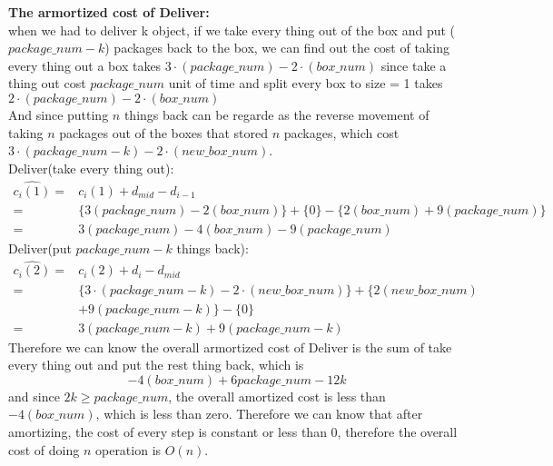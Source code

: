 \documentclass{homework}
\begin{document}
\begin{itemize}
    \textbf{The armortized cost of Deliver:}\\
    when we had to deliver k object, if we take every thing out of the box and put ($package\_num-k$) packages back to the box, we can find out the cost of taking every thing out a box takes $3\cdot(package\_num) - 2\cdot(box\_num)$ since take a thing out cost $package\_num$ unit of time and split every box to size = 1 takes $2\cdot(package\_num) - 2\cdot(box\_num)$\\
    And since putting $n$ things back can be regarde as the reverse movement of taking $n$ packages out of the boxes that stored $n$ packages, which cost $3\cdot(package\_num - k) - 2\cdot(new\_box\_num)$.\\
    Deliver(take every thing out):\\
    \begin{align*}
        \hat{c_i(1)} =& c_i(1) + d_{mid} - d_{i-1}\\
                  =& \{3(package\_num)-2(box\_num)\} + \{0\} - \{2(box\_num)+9(package\_num)\}\\
                  =& 3(package\_num)-4(box\_num)-9(package\_num)
    \end{align*}
    Deliver(put $package\_num - k$ things back):\\
    \begin{align*}
        \hat{c_i(2)} =& c_i(2) + d_i - d_{mid}\\
                  =& \{3\cdot(package\_num - k) - 2\cdot(new\_box\_num)\} + \{2(new\_box\_num)\\
                   & +9(package\_num - k)\} - \{0\}\\
                  =& 3(package\_num - k)+9(package\_num - k)
    \end{align*}
    Therefore we can know the overall armortized cost of Deliver is the sum of take every thing out and put the rest thing back, which is\\
    \[-4(box\_num) + 6package\_num - 12k\]
    and since $2k \geq package\_num$, the overall amortized cost is less than $-4(box\_num)$, which is less than zero. Therefore we can know that after amortizing, the cost of every step is constant or less than 0, therefore the overall cost of doing $n$ operation is $O(n)$.\\
\end{itemize}
\clearpage
\end{document}
